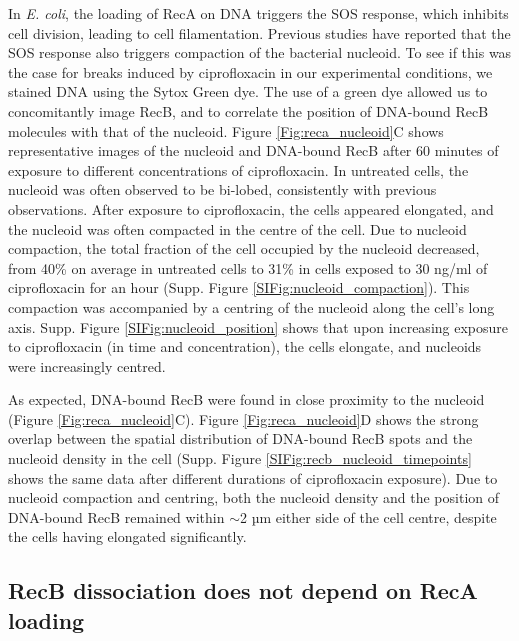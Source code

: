 In \emph{E. coli}, the loading of RecA on DNA triggers the SOS response, which inhibits cell division, leading to cell filamentation. Previous studies have reported that the SOS response also triggers compaction of the bacterial nucleoid\cite{Odsbu2014}. To see if this was the case for breaks induced by ciprofloxacin in our experimental conditions, we stained DNA using the Sytox Green dye. The use of a green dye allowed us to concomitantly image RecB, and to correlate the position of DNA-bound RecB molecules with that of the nucleoid. Figure \ref{Fig:reca_nucleoid}C shows representative images of the nucleoid and DNA-bound RecB after 60 minutes of exposure to different concentrations of ciprofloxacin. In untreated cells, the nucleoid was often observed to be bi-lobed, consistently with previous observations\cite{Lepore2023}. After exposure to ciprofloxacin, the cells appeared elongated, and the nucleoid was often compacted in the centre of the cell. Due to nucleoid compaction, the total fraction of the cell occupied by the nucleoid decreased, from 40\% on average in untreated cells to 31\% in cells exposed to 30 ng/ml of ciprofloxacin for an hour (Supp. Figure \ref{SIFig:nucleoid_compaction}). This compaction was accompanied by a centring of the nucleoid along the cell's long axis. Supp. Figure \ref{SIFig:nucleoid_position} shows that upon increasing exposure to ciprofloxacin (in time and concentration), the cells elongate, and nucleoids were increasingly centred.

As expected, DNA-bound RecB were found in close proximity to the nucleoid (Figure \ref{Fig:reca_nucleoid}C). Figure \ref{Fig:reca_nucleoid}D shows the strong overlap between the spatial distribution of DNA-bound RecB spots and the nucleoid density in the cell (Supp. Figure \ref{SIFig:recb_nucleoid_timepoints} shows the same data after different durations of ciprofloxacin exposure). Due to nucleoid compaction and centring, both the nucleoid density and the position of DNA-bound RecB remained within $\sim$2 µm either side of the cell centre, despite the cells having elongated significantly.

\subsection*{RecB dissociation does not depend on RecA loading}

